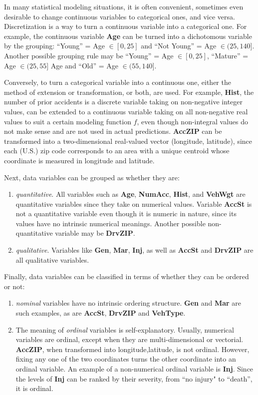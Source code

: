\documentclass[12pt]{article}
\begin{document}
\par
In many statistical modeling situations, it is often convenient, sometimes even desirable to change continuous variables to categorical ones, and vice versa.  Discretization is a way to turn a continuous variable into a categorical one.  For example, the continuous variable \textbf{Age} can be turned into a dichotomous variable by the grouping: ``Young'' = Age $\in [0,25]$ and ``Not Young'' = Age $\in (25,140]$.  Another possible grouping rule may be ``Young'' = Age $\in [0,25]$, ``Mature'' = Age $\in (25,55]$ Age  and ``Old'' = Age $\in (55,140]$.  
\par
Conversely, to turn a categorical variable into a continuous one, either the method of extension or transformation, or both, are used.  For example, \textbf{Hist}, the number of prior accidents is a discrete variable taking on non-negative integer values, can be extended to a continuous variable taking on all non-negative real values to suit a certain modeling function $f$, even though non-integral values do not make sense and are not used in actual predictions.  \textbf{AccZIP} can be transformed into a two-dimensional real-valued vector (longitude, latitude), since each (U.S.) zip code corresponds to an area with a unique centroid whose coordinate is measured in longitude and latitude.
\par
Next, data variables can be grouped as whether they are:
\begin{enumerate}
\item \emph{quantitative}.  All variables such as \textbf{Age}, \textbf{NumAcc}, \textbf{Hist}, and \textbf{VehWgt} are quantitative variables since they take on numerical values.  Variable \textbf{AccSt} is not a quantitative variable even though it is numeric in nature, since its values have no intrinsic numerical meanings.  Another possible non-quantitative variable may be \textbf{DrvZIP}.
\item \emph{qualitative}.  Variables like \textbf{Gen}, \textbf{Mar}, \textbf{Inj}, as well as \textbf{AccSt} and \textbf{DrvZIP} are all qualitative variables.
\end{enumerate}
\par
Finally, data variables can be classified in terms of whether they can be ordered or not:
\begin{enumerate}
\item \emph{nominal} variables have no intrinsic ordering structure.  \textbf{Gen} and \textbf{Mar} are such examples, as are \textbf{AccSt}, \textbf{DrvZIP} and \textbf{VehType}.
\item The meaning of \emph{ordinal} variables is self-explanatory.  Usually, numerical variables are ordinal, except when they are multi-dimensional or vectorial.  \textbf{AccZIP}, when transformed into {longitude,latitude}, is not ordinal.  However, fixing any one of the two coordinates turns the other coordinate into an ordinal variable.  An example of a non-numerical ordinal variable is \textbf{Inj}.  Since the levels of \textbf{Inj} can be ranked by their severity, from ``no injury" to ``death'', it is ordinal.
\end{enumerate}
\end{document}
